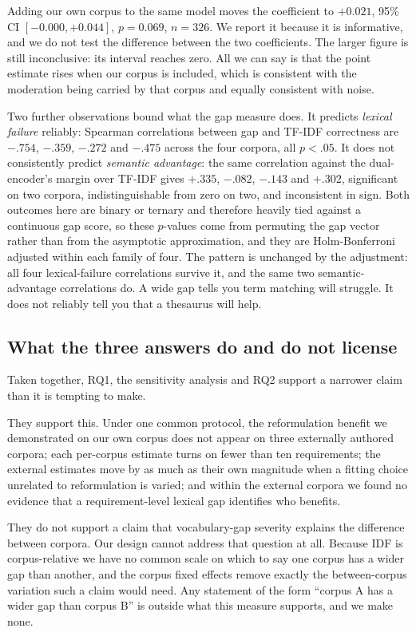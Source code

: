 \documentclass[a4paper,fleqn]{cas-sc}
\begin{document}
Adding our own corpus to the same model moves the coefficient to $+0.021$, 95\% CI $[-0.000, +0.044]$, $p = 0.069$, $n = 326$. We report it because it is informative, and we do not test the difference between the two coefficients. The larger figure is still inconclusive: its interval reaches zero. All we can say is that the point estimate rises when our corpus is included, which is consistent with the moderation being carried by that corpus and equally consistent with noise.

Two further observations bound what the gap measure does. It predicts \emph{lexical failure} reliably: Spearman correlations between gap and TF-IDF correctness are $-.754$, $-.359$, $-.272$ and $-.475$ across the four corpora, all $p < .05$. It does not consistently predict \emph{semantic advantage}: the same correlation against the dual-encoder's margin over TF-IDF gives $+.335$, $-.082$, $-.143$ and $+.302$, significant on two corpora, indistinguishable from zero on two, and inconsistent in sign. Both outcomes here are binary or ternary and therefore heavily tied against a continuous gap score, so these $p$-values come from permuting the gap vector rather than from the asymptotic approximation, and they are Holm-Bonferroni adjusted within each family of four. The pattern is unchanged by the adjustment: all four lexical-failure correlations survive it, and the same two semantic-advantage correlations do. A wide gap tells you term matching will struggle. It does not reliably tell you that a thesaurus will help.

\subsection{What the three answers do and do not license}
\label{sec:results-license}

Taken together, RQ1, the sensitivity analysis and RQ2 support a narrower claim than it is tempting to make.

They support this. Under one common protocol, the reformulation benefit we demonstrated on our own corpus does not appear on three externally authored corpora; each per-corpus estimate turns on fewer than ten requirements; the external estimates move by as much as their own magnitude when a fitting choice unrelated to reformulation is varied; and within the external corpora we found no evidence that a requirement-level lexical gap identifies who benefits.

They do not support a claim that vocabulary-gap severity explains the difference between corpora. Our design cannot address that question at all. Because IDF is corpus-relative we have no common scale on which to say one corpus has a wider gap than another, and the corpus fixed effects remove exactly the between-corpus variation such a claim would need. Any statement of the form ``corpus A has a wider gap than corpus B'' is outside what this measure supports, and we make none.
\end{document}
